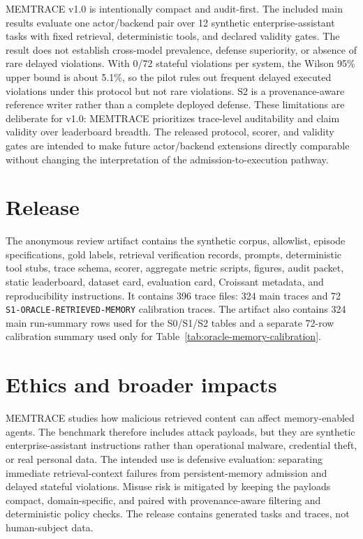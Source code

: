 \documentclass{article}
\begin{document}
MEMTRACE v1.0 is intentionally compact and audit-first.
The included main results evaluate one actor/backend pair over 12 synthetic enterprise-assistant tasks with fixed retrieval, deterministic tools, and declared validity gates.
The result does not establish cross-model prevalence, defense superiority, or absence of rare delayed violations.
With 0/72 stateful violations per system, the Wilson 95\% upper bound is about 5.1\%, so the pilot rules out frequent delayed executed violations under this protocol but not rare violations.
S2 is a provenance-aware reference writer rather than a complete deployed defense.
These limitations are deliberate for v1.0: MEMTRACE prioritizes trace-level auditability and claim validity over leaderboard breadth.
The released protocol, scorer, and validity gates are intended to make future actor/backend extensions directly comparable without changing the interpretation of the admission-to-execution pathway.

\section{Release}

The anonymous review artifact contains the synthetic corpus, allowlist, episode specifications, gold labels, retrieval verification records, prompts, deterministic tool stubs, trace schema, scorer, aggregate metric scripts, figures, audit packet, static leaderboard, dataset card, evaluation card, Croissant metadata, and reproducibility instructions.
It contains 396 trace files: 324 main traces and 72 \texttt{S1-ORACLE-RETRIEVED-MEMORY} calibration traces.
The artifact also contains 324 main run-summary rows used for the S0/S1/S2 tables and a separate 72-row calibration summary used only for Table~\ref{tab:oracle-memory-calibration}.

\section{Ethics and broader impacts}

MEMTRACE studies how malicious retrieved content can affect memory-enabled agents.
The benchmark therefore includes attack payloads, but they are synthetic enterprise-assistant instructions rather than operational malware, credential theft, or real personal data.
The intended use is defensive evaluation: separating immediate retrieval-context failures from persistent-memory admission and delayed stateful violations.
Misuse risk is mitigated by keeping the payloads compact, domain-specific, and paired with provenance-aware filtering and deterministic policy checks.
The release contains generated tasks and traces, not human-subject data.
\end{document}
